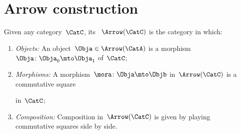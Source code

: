 
\section{Arrow construction}


\begin{ctdefinition}
    \label{def:arrow_category}
    Given any category~$\CatC$, its \emph{}~$\Arrow(\CatC)$ is the category in which:
    \begin{enumerate}
        \item \emph{Objects:} An object~$\Obja \in \Arrow(\CatA)$ is a morphism~$\Obja\colon \Obja_0\mto \Obja_1$ of~$\CatC$;
        \item \emph{Morphisms:} A morphism~$\mora\colon \Obja \mto \Objb$ in~$\Arrow(\CatC)$ is a commutative square
              \begin{center}
              \end{center}
              in~$\CatC$;
        \item \emph{Composition:} Composition in~$\Arrow(\CatC)$ is given by playing commutative squares side by side.
    \end{enumerate}
\end{ctdefinition}
